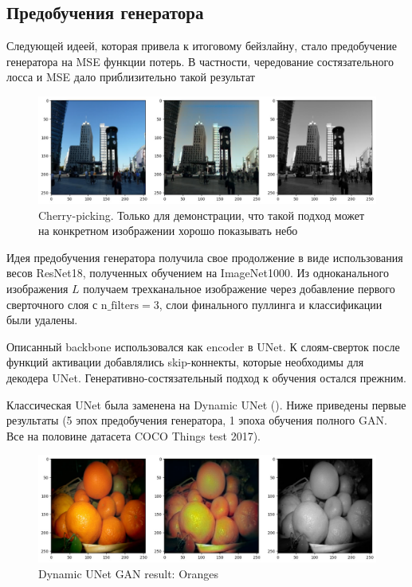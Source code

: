 \documentclass[14pt]{article}
\begin{document}
\subsection{Предобучения генератора}

Следующей идеей, которая привела к итоговому бейзлайну, стало предобучение генератора на
MSE функции потерь. В частности, чередование состязательного лосса и MSE дало приблизительно такой результат


\begin{figure}[H]
    \centering
    \includegraphics[width=1.0\textwidth]{resources/gan_and_chaos_pretrain.png}
    \caption{Cherry-picking. Только для демонстрации, что такой подход может на конкретном изображении хорошо показывать небо}
    \label{fig:id_figura}
\end{figure}


Идея предобучения генератора получила свое продолжение в виде использования весов ResNet18, полученных обучением
на ImageNet1000. Из одноканального изображения $L$ получаем трехканальное изображение через добавление первого сверточного слоя
с $\text{n\_filters}=3$, слои финального пуллинга и классификации были удалены.

Описанный backbone использовался как encoder в UNet. К слоям-сверток после функций активации добавлялись skip-коннекты, которые
необходимы для декодера UNet. Генеративно-состязательный подход к обучения остался прежним.

Классическая UNet была заменена на Dynamic UNet (\cite{yang2024dynamicunetadaptivelycalibrate}). Ниже приведены
первые результаты (5 эпох предобучения генератора, 1 эпоха обучения полного GAN. Все на половине датасета COCO Things test 2017).

\begin{figure}[H]
    \centering
    \includegraphics[width=1.0\textwidth]{resources/dynamic_unet_gan_results/oranges.png}
    \caption{Dynamic UNet GAN result: Oranges}
    \label{fig:oranges}
\end{figure}
\end{document}
